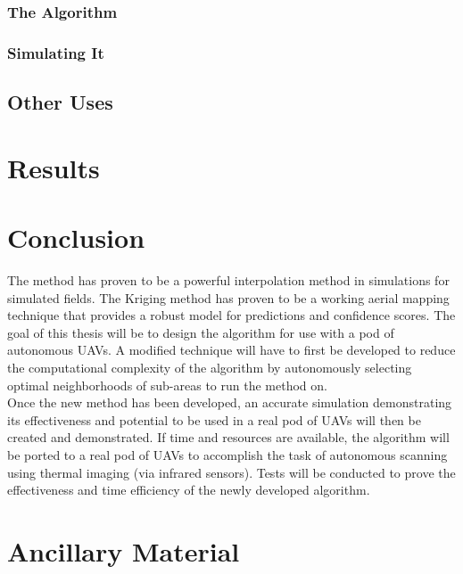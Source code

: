 \documentclass[11pt]{ucthesis}
\begin{document}
\subsection{The Algorithm}
\subsection{Simulating It}

\section{Other Uses}

\chapter{Results}

\chapter{Conclusion}
The method has proven to be a powerful interpolation method in simulations for simulated fields. The Kriging method has proven to be a working aerial mapping technique that provides a robust model for predictions and confidence scores. The goal of this thesis will be to design the algorithm for use with a pod of autonomous UAVs. A modified technique will have to first be developed to reduce the computational complexity of the algorithm by autonomously selecting optimal neighborhoods of sub-areas to run the method on.\\
Once the new method has been developed, an accurate simulation demonstrating its effectiveness and potential to be used in a real pod of UAVs will then be created and demonstrated. 
If time and resources are available, the algorithm will be ported to a real pod of UAVs to accomplish the task of autonomous scanning using thermal imaging (via infrared sensors). Tests will be conducted to prove the effectiveness and time efficiency of the newly developed algorithm.

\nocite{*}



\appendix
\chapter{Ancillary Material}
\end{document}
